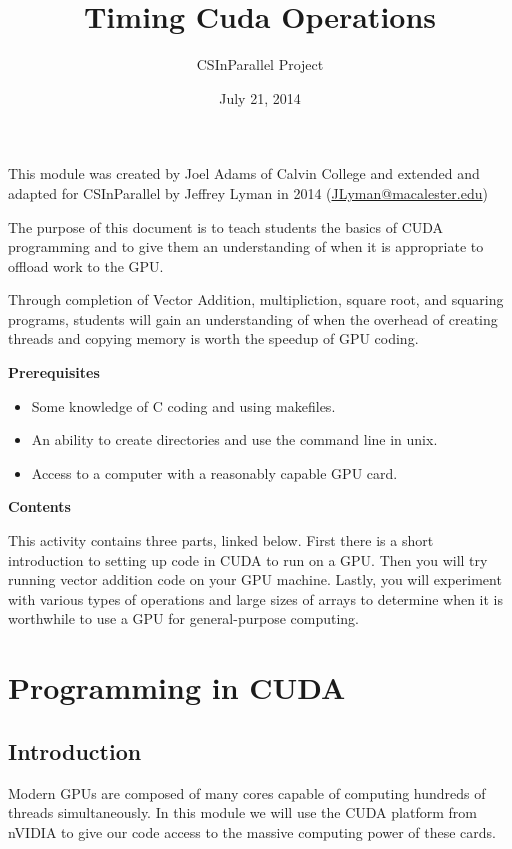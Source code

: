 \documentclass[letterpaper,10pt,openany,oneside]{sphinxmanual}
\title{Timing Cuda Operations}
\date{July 21, 2014}
\author{CSInParallel Project}
\begin{document}
\maketitle
\tableofcontents
{}\label{index::doc}


This module was created by Joel Adams of Calvin College and extended and adapted
for CSInParallel by Jeffrey Lyman in 2014 (\href{mailto:JLyman@macalester.edu}{JLyman@macalester.edu})

The purpose of this document is to teach students the basics of
CUDA programming and to give them an understanding of when it is
appropriate to offload work to the GPU.

Through completion of Vector Addition, multipliction, square root,
and squaring programs, students will gain an understanding of
when the overhead of creating threads and copying memory is worth
the speedup of GPU coding.

\textbf{Prerequisites}
\begin{itemize}
\item {} 
Some knowledge of C coding and using makefiles.

\item {} 
An ability to create directories and use the command line in unix.

\item {} 
Access to a computer with a reasonably capable GPU card.

\end{itemize}

\textbf{Contents}

This activity contains three parts, linked below.  First there is a short introduction to setting up code in CUDA to run on a GPU. Then you will try running vector addition code on your GPU machine. Lastly, you will experiment with various types of operations and large sizes of arrays to determine when it is worthwhile to use a GPU for general-purpose computing.


\chapter{Programming in CUDA}
\label{0-Introduction/Introduction:programming-in-cuda}\label{0-Introduction/Introduction::doc}\label{0-Introduction/Introduction:timing-cuda-operations}

\section{Introduction}
\label{0-Introduction/Introduction:introduction}
Modern GPUs are composed of many cores capable of computing hundreds of threads simultaneously.
In this module we will use the CUDA platform from nVIDIA to give our code access to the
massive computing power of these cards.
\end{document}
